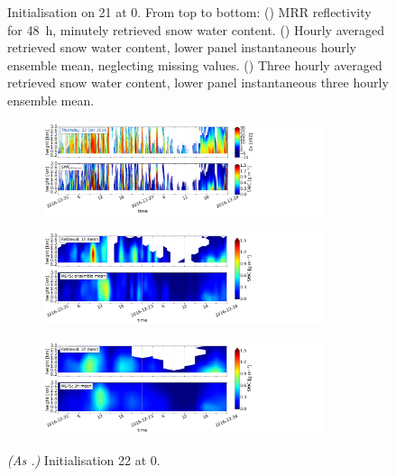 \begin{figure}[H]
\begin{subfigure}[t]{1.05\textwidth}
		\caption{}\label{fig:SWC3h:21}
	\end{subfigure}
	\caption{Initialisation on \SI{21}{\dec} at \SI{0}{\UTC}. From top to bottom: (\protect{}) MRR reflectivity for \SI{48}{\hour}, minutely retrieved snow water content.
		(\protect{}) Hourly averaged retrieved snow water content, lower panel instantaneous hourly ensemble mean, %
        neglecting missing values. 
		(\protect{}) Three hourly averaged retrieved snow water content, lower panel instantaneous three hourly ensemble mean. %
        }\label{fig:SWC21}
\end{figure}
\begin{figure}[H]
	\centering
	\begin{subfigure}[t]{1.05\textwidth}
		\centering
		\includegraphics[trim={0.cm 2.2cm 19.cm 0.5cm},clip,width=0.9\textwidth]{./fig_obs_ret/20161222}
		\caption{}\label{fig:SWC:ret_22}
	\end{subfigure}
	\begin{subfigure}[t]{1.05\textwidth}
		\centering
		\includegraphics[trim={0.cm 2.2cm 19.cm 0.5cm},clip,width=0.9\textwidth]{./fig_vert_SWC_EM/20161222}
		\caption{}\label{fig:SWC_EM:22}
	\end{subfigure}
	\begin{subfigure}[t]{1.05\textwidth}
		\centering
		\includegraphics[trim={0.cm 0.8cm 19.cm 0.5cm},clip,width=0.9\textwidth]{./fig_vert_SWC_3h/20161222}
		\caption{}\label{fig:SWC3h:22}
	\end{subfigure}
	\caption{\textit{(As .)} Initialisation \SI{22}{\dec} at \SI{0}{\UTC}.}\label{fig:SWC22}
\end{figure}
